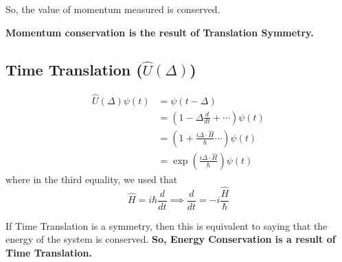 \documentclass{article}
\begin{document}
So, the value of momentum measured is conserved.

\textbf{Momentum conservation is the result of Translation Symmetry.}

\subsection{Time Translation ($\hat{U}(\Delta)$)}
\begin{align*}
  \hat{U}(\Delta)\psi(t) &= \psi(t - \Delta) \\
  &= \left( 1 - \Delta\frac{d}{dt} + \cdots \right) \psi(t) \\
  &=\left( 1 + \frac{i \Delta \cdot \hat{H}}{\hbar} \cdots \right)\psi(t) \\
  &= \exp\left( \frac{i \Delta \cdot \hat{H}}{\hbar} \right) \psi(t)
\end{align*}
where in the third equality, we used that 
\[ \hat{H} = i\hbar\frac{d}{dt} \implies \frac{d}{dt} = -i\frac{\hat{H}}{\hbar} \]

If Time Translation is a symmetry, then this is equivalent to saying that 
the energy of the system is conserved. \textbf{So, Energy Conservation is a result of Time Translation.}
\end{document}
